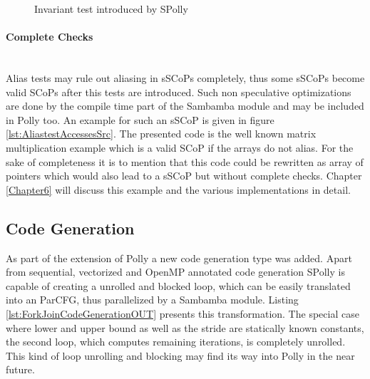\lstset{frame=none}
\begin{figure}[htbp]
  \centering
  \hspace*{5mm}
  \caption{Invariant test introduced by SPolly}
  \label{lst:InvariantTest}  
\end{figure}
\resetlst

\paragraph{Complete Checks \\}
~\\
Alias tests may rule out aliasing in sSCoPs completely, thus some sSCoPs become
valid SCoPs after this tests are introduced. Such non speculative optimizations
are done by the compile time part of the Sambamba module and may be included in 
Polly too. An example for such an sSCoP is given in figure 
\ref{lst:AliastestAccessesSrc}. The presented code is the well known
matrix multiplication example which is a valid SCoP if the arrays do not alias.
For the sake of completeness it is to mention that this code could be
rewritten as array of pointers which would also lead to a sSCoP but without
complete checks. Chapter \ref{Chapter6} will discuss this example and the various
implementations in detail.


\subsection{Code Generation}
As part of the extension of Polly a new code generation type was added. Apart 
from sequential, vectorized and OpenMP annotated code generation SPolly is 
capable of creating a unrolled and blocked loop, which can be easily 
translated into an ParCFG, thus parallelized by a Sambamba module. Listing 
\ref{lst:ForkJoinCodeGenerationOUT} presents this transformation. The special 
case where lower and upper bound as well as the 
stride are statically known constants, the second loop, which computes 
remaining iterations, is completely unrolled.
This kind of loop unrolling and blocking may find its 
way into Polly in the near future. 

